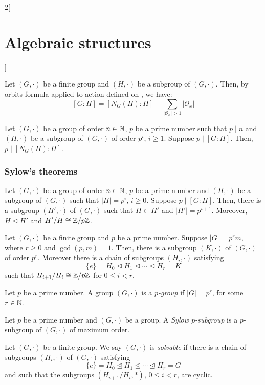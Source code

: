 \documentclass[../../../main_math.tex]{subfiles}
\begin{document}
\begin{multicols}{2}[\section{Algebraic structures}]
\begin{lemma}
  \end{lemma}
  \begin{corollary}
    Let $(G,\cdot)$ be a finite group and $(H,\cdot)$ be a subgroup of $(G,\cdot)$. Then, by orbits formula applied to action defined on , we have: $$[G:H]=[N_G(H):H]+\sum_{|\mathcal{O}_x|>1}|\mathcal{O}_x|$$
  \end{corollary}
  \begin{proposition}
    Let $(G,\cdot)$ be a group of order $n\in\mathbb{N} $, $p$ be a prime number such that $p\mid n$ and $(H,\cdot)$ be a subgroup of $(G,\cdot)$ of order $p^i$, $i\geq 1$. Suppose $p\mid[G:H]$. Then, $p\mid[N_G(H):H]$.
  \end{proposition}
  \subsubsection{Sylow's theorems}
  \begin{corollary}
    Let $(G,\cdot)$ be a group of order $n\in\mathbb{N} $, $p$ be a prime number and $(H,\cdot)$ be a subgroup of $(G,\cdot)$ such that $|H|=p^i$, $i\geq 0$. Suppose $p\mid[G:H]$. Then, there is a subgroup $(H',\cdot)$ of $(G,\cdot)$ such that $H\subset H'$ and $|H'|=p^{i+1}$. Moreover, $H\unlhd H'$ and $H'/H\cong\mathbb{Z} /p\mathbb{Z} $.
  \end{corollary}
  \begin{theorem}
    Let $(G,\cdot)$ be a finite group and $p$ be a prime number. Suppose $|G|=p^r m$, where $r\geq 0$ and $\gcd(p,m)=1$. Then, there is a subgroup $(K,\cdot)$ of $(G,\cdot)$ of order $p^r$. Moreover there is a chain of subgroups $(H_i,\cdot)$ satisfying $$\{e\}=H_0\unlhd H_1\unlhd\cdots\unlhd H_r=K$$ such that $H_{i+1}/H_i\cong\mathbb{Z} /p\mathbb{Z} $ for $0\leq i<r$.
  \end{theorem}
  \begin{definition}
    Let $p$ be a prime number. A group $(G,\cdot)$ is a \emph{$p$-group} if $|G|=p^r$, for some $r\in\mathbb{N} $.
  \end{definition}
  \begin{definition}
    Let $p$ be a prime number and $(G,\cdot)$ be a group. A \emph{Sylow $p$-subgroup} is a $p$-subgroup of $(G,\cdot)$ of maximum order.
  \end{definition}
  \begin{definition}
    Let $(G,\cdot)$ be a finite group. We say $(G,\cdot)$ is \emph{solvable} if there is a chain of subgroups $(H_i,\cdot)$ of $(G,\cdot)$ satisfying $$\{e\}=H_0\unlhd H_1\unlhd\cdots\unlhd H_r=G$$ and such that the subgroups $(H_{i+1}/H_i,*)$, $0\leq i<r$, are cyclic.

\end{definition}
\end{multicols}
\end{document}

